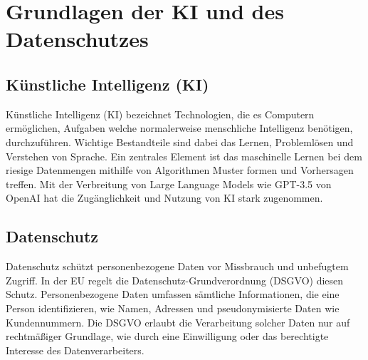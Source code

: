 \chapter{Grundlagen der KI und des Datenschutzes}

\section{Künstliche Intelligenz (KI)}

Künstliche Intelligenz (KI) bezeichnet Technologien, die es Computern
ermöglichen, Aufgaben welche normalerweise menschliche Intelligenz benötigen,
durchzuführen. Wichtige Bestandteile sind dabei das Lernen, Problemlösen und
Verstehen von Sprache. Ein zentrales Element ist das maschinelle Lernen
bei dem riesige Datenmengen mithilfe von Algorithmen Muster formen und
Vorhersagen treffen. Mit der Verbreitung von Large Language Models wie
GPT-3.5 von OpenAI hat die Zugänglichkeit und Nutzung von KI stark zugenommen. 
\cite{haerting2024}

\section{Datenschutz}

Datenschutz schützt personenbezogene Daten vor Missbrauch und unbefugtem
Zugriff. In der EU regelt die Datenschutz-Grundverordnung (DSGVO) diesen Schutz.
Personenbezogene Daten umfassen sämtliche Informationen, die eine Person
identifizieren, wie Namen, Adressen und pseudonymisierte Daten wie
Kundennummern. Die DSGVO erlaubt die Verarbeitung solcher Daten nur auf
rechtmäßiger Grundlage, wie durch eine Einwilligung oder das berechtigte
Interesse des Datenverarbeiters.

\cite{haerting2024}

